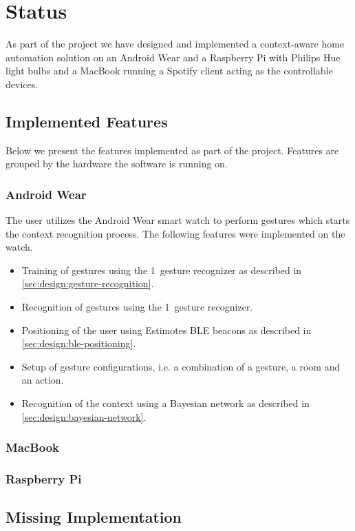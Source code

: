 \section{Status}
\label{sec:implementation:status}

As part of the project we have designed and implemented a context-aware home automation solution on an Android Wear and a Raspberry Pi with Philips Hue light bulbs and a MacBook running a Spotify client acting as the controllable devices. 


\subsection{Implemented Features}

Below we present the features implemented as part of the project. Features are grouped by the hardware the software is running on.

\subsubsection{Android Wear}

The user utilizes the Android Wear smart watch to perform gestures which starts the context recognition process. The following features were implemented on the watch.

\begin{itemize}
\item Training of gestures using the 1\textcent~gesture recognizer as described in \cref{sec:design:gesture-recognition}.
\item Recognition of gestures using the 1\textcent~gesture recognizer.
\item Positioning of the user using Estimotes BLE beacons as described in \cref{sec:design:ble-positioning}.
\item Setup of gesture configurations, i.e. a combination of a gesture, a room and an action.
\item Recognition of the context using a Bayesian network as described in \cref{sec:design:bayesian-network}.
\end{itemize}

\subsubsection{MacBook}

\subsubsection{Raspberry Pi}



\subsection{Missing Implementation}



